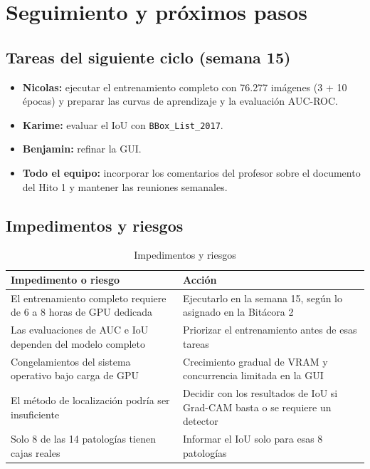 \documentclass[11.5pt]{article}
\begin{document}
\section{Seguimiento y próximos pasos}

\subsection{Tareas del siguiente ciclo (semana 15)}

\begin{itemize}
    \item \textbf{Nicolas:} ejecutar el entrenamiento completo con 76.277 imágenes (3 + 10 épocas) y preparar las curvas de aprendizaje y la evaluación AUC-ROC.
    \item \textbf{Karime:} evaluar el IoU con \texttt{BBox\_List\_2017}.
    \item \textbf{Benjamin:} refinar la GUI.
    \item \textbf{Todo el equipo:} incorporar los comentarios del profesor sobre el documento del Hito 1 y mantener las reuniones semanales.
\end{itemize}

\subsection{Impedimentos y riesgos}

\begin{table}[H]
\centering
\small
\caption{Impedimentos y riesgos}
\label{tab:riesgos}
\begin{tabularx}{\textwidth}{X X}
\toprule
Impedimento o riesgo & Acción \\
\midrule
El entrenamiento completo requiere de 6 a 8 horas de GPU dedicada & Ejecutarlo en la semana 15, según lo asignado en la Bitácora 2 \\
Las evaluaciones de AUC e IoU dependen del modelo completo & Priorizar el entrenamiento antes de esas tareas \\
Congelamientos del sistema operativo bajo carga de GPU & Crecimiento gradual de VRAM y concurrencia limitada en la GUI \\
El método de localización podría ser insuficiente & Decidir con los resultados de IoU si Grad-CAM basta o se requiere un detector \\
Solo 8 de las 14 patologías tienen cajas reales & Informar el IoU solo para esas 8 patologías \\
\bottomrule
\end{tabularx}
\end{table}
\end{document}
